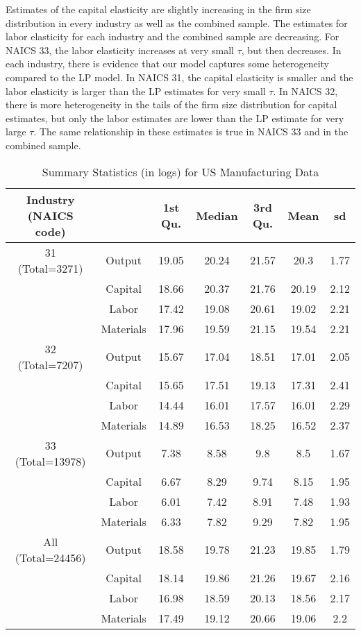 \documentclass[11pt]{article}
\begin{document}
Estimates of the capital elasticity are slightly increasing in the firm size distribution in every industry as well as the combined sample. The estimates for labor elasticity for each industry and the combined sample are decreasing. For NAICS 33, the labor elasticity increases at very small $\tau$, but then decreases. In each industry, there is evidence that our model captures some heterogeneity compared to the LP model. In NAICS 31, the capital elasticity is smaller and the labor elasticity is larger than the LP estimates for very small $\tau$. In NAICS 32, there is more heterogeneity in the tails of the firm size distribution for capital estimates, but only the labor estimates are lower than the LP estimate for very large $\tau$. The same relationship in these estimates is true in NAICS 33 and in the combined sample.
 
\begin{table}[H]
\centering
\caption{Summary Statistics (in logs) for US Manufacturing Data}
\begin{tabular}{ccccccc}
  \hline\hline Industry (NAICS code) &   & 1st Qu. & Median & 3rd Qu. & Mean & sd \\ 
  \hline
31 (Total=3271) & Output & 19.05 & 20.24 & 21.57 & 20.3 & 1.77 \\ 
   & Capital & 18.66 & 20.37 & 21.76 & 20.19 & 2.12 \\ 
   & Labor & 17.42 & 19.08 & 20.61 & 19.02 & 2.21 \\ 
   & Materials & 17.96 & 19.59 & 21.15 & 19.54 & 2.21 \\ 
  32 (Total=7207) & Output & 15.67 & 17.04 & 18.51 & 17.01 & 2.05 \\ 
   & Capital & 15.65 & 17.51 & 19.13 & 17.31 & 2.41 \\ 
   & Labor & 14.44 & 16.01 & 17.57 & 16.01 & 2.29 \\ 
   & Materials & 14.89 & 16.53 & 18.25 & 16.52 & 2.37 \\ 
  33 (Total=13978) & Output & 7.38 & 8.58 & 9.8 & 8.5 & 1.67 \\ 
   & Capital & 6.67 & 8.29 & 9.74 & 8.15 & 1.95 \\ 
   & Labor & 6.01 & 7.42 & 8.91 & 7.48 & 1.93 \\ 
   & Materials & 6.33 & 7.82 & 9.29 & 7.82 & 1.95 \\ 
  All (Total=24456) & Output & 18.58 & 19.78 & 21.23 & 19.85 & 1.79 \\ 
   & Capital & 18.14 & 19.86 & 21.26 & 19.67 & 2.16 \\ 
   & Labor & 16.98 & 18.59 & 20.13 & 18.56 & 2.17 \\ 
   & Materials & 17.49 & 19.12 & 20.66 & 19.06 & 2.2 \\ 
   \hline
\end{tabular}
\label{USsum}
\end{table}
\end{document}
